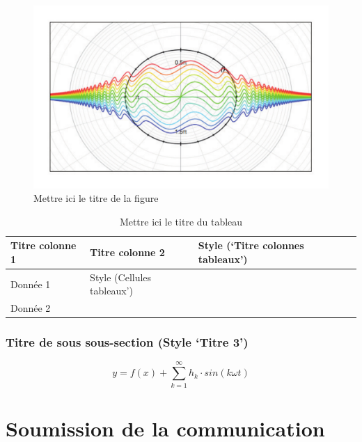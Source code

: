 \documentclass[a4paper,10pt,twocolumn]{article}
\begin{document}
\begin{figure}[!ht]
	\begin{center}
		\includegraphics[width=0.9\columnwidth]{fig_1.pdf}
	\end{center}
	
	\caption{Mettre ici le titre de la figure}
	\label{fig_1}
\end{figure}

\begin{table}[!h]
	\caption{Mettre ici le titre du tableau}
	
\centering
		\begin{tabular}{|>{\footnotesize}L{1.4cm}|>{\footnotesize}L{1.5cm}|>{\footnotesize}L{2.4cm}|>{\footnotesize}L{2.1cm}|}
			\hline
			\textbf{Titre colonne 1} & \textbf{Titre colonne 2} & \textbf{Style (‘Titre colonnes tableaux’)} & \textbf{} \\
			\hline
			Donnée 1 & Style (Cellules tableaux’) & & \\
			\hline
			Donnée 2 & & & \\
			\hline
		\end{tabular}

	
	\label{tab_1}
\end{table}

\subsubsection{Titre de sous sous-section (Style ‘Titre 3’)}

\begin{equation}
	y = f(x) + \sum_{k=1}^{\infty} h_k \cdot sin(k \omega t)
	\label{eq_1}
\end{equation}

\section{Soumission de la communication}
\end{document}
